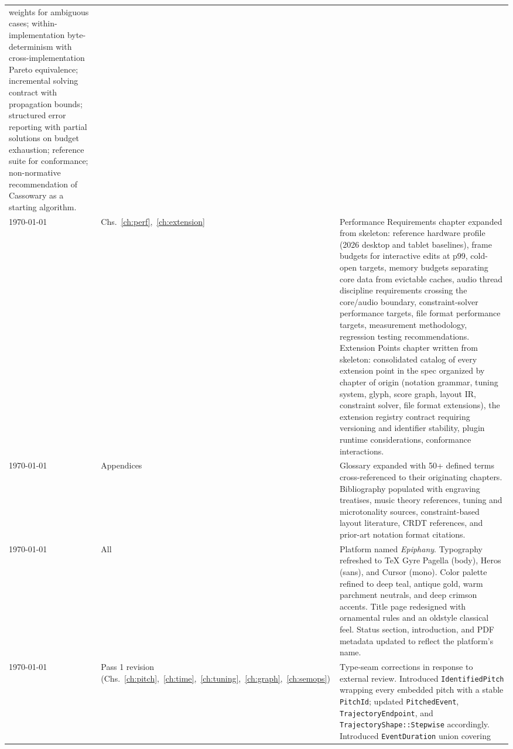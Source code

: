 \documentclass[11pt,letterpaper]{report}
\newcounter{requirement}[chapter]
\begin{document}
\begin{longtable}{p{2cm} p{2.5cm} p{9cm}}
  weights for ambiguous cases; within-implementation byte-determinism
  with cross-implementation Pareto equivalence; incremental solving
  contract with propagation bounds; structured error reporting with
  partial solutions on budget exhaustion; reference suite for
  conformance; non-normative recommendation of Cassowary as a
  starting algorithm. \\
  \today & Chs.~\ref{ch:perf},~\ref{ch:extension} &
  Performance Requirements chapter expanded from skeleton: reference
  hardware profile (2026 desktop and tablet baselines), frame budgets
  for interactive edits at p99, cold-open targets, memory budgets
  separating core data from evictable caches, audio thread discipline
  requirements crossing the core/audio boundary, constraint-solver
  performance targets, file format performance targets, measurement
  methodology, regression testing recommendations. Extension Points
  chapter written from skeleton: consolidated catalog of every
  extension point in the spec organized by chapter of origin
  (notation grammar, tuning system, glyph, score graph, layout IR,
  constraint solver, file format extensions), the extension registry
  contract requiring versioning and identifier stability, plugin
  runtime considerations, conformance interactions. \\
  \today & Appendices & Glossary expanded with 50+ defined terms
  cross-referenced to their originating chapters. Bibliography
  populated with engraving treatises, music theory references,
  tuning and microtonality sources, constraint-based layout
  literature, CRDT references, and prior-art notation format
  citations. \\
  \today & All & Platform named \textit{Epiphany}. Typography refreshed
  to TeX Gyre Pagella (body), Heros (sans), and Cursor (mono).
  Color palette refined to deep teal, antique gold, warm parchment
  neutrals, and deep crimson accents. Title page redesigned with
  ornamental rules and an oldstyle classical feel. Status section,
  introduction, and PDF metadata updated to reflect the platform's
  name. \\
  \today & Pass 1 revision (Chs.~\ref{ch:pitch},~\ref{ch:time},~\ref{ch:tuning},~\ref{ch:graph},~\ref{ch:semops}) &
  Type-seam corrections in response to external review.
  Introduced \texttt{IdentifiedPitch} wrapping every embedded pitch
  with a stable \texttt{PitchId}; updated \texttt{PitchedEvent},
  \texttt{TrajectoryEndpoint}, and \texttt{TrajectoryShape::Stepwise}
  accordingly. Introduced \texttt{EventDuration} union covering

\end{longtable}
\end{document}

